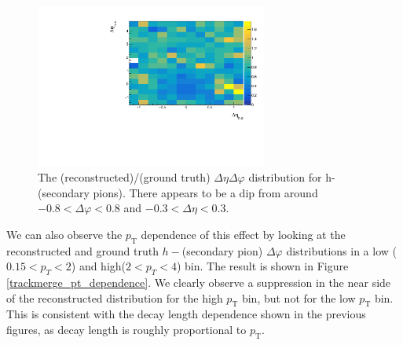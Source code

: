 \documentclass[ALICE,manyauthors]{ALICE_analysis_notes}
\begin{document}
\begin{figure}[ht]
\centering
\includegraphics[width=3in]{figures/h_secondary_pi_mc_ratio.pdf}
\caption{The  (reconstructed)/(ground truth)  $\Delta\eta\Delta\varphi$  distribution for h-(secondary pions). There appears to be a dip from around $-0.8 < \Delta\varphi < 0.8$ and $-0.3 < \Delta\eta < 0.3$.}
\label{h_secondary_pi_mc_ratio}
\end{figure}

We can also observe the $p_\text{T}$ dependence of this effect by looking at the reconstructed and ground truth $h-$(secondary pion) $\Delta\varphi$ distributions in a low ($0.15 < p_{T} < 2$) and high($2 < p_{T} < 4$) bin. The result is shown in Figure \ref{trackmerge_pt_dependence}. We clearly observe a suppression in the near side of the reconstructed distribution for the high $p_\text{T}$ bin, but not for the low $p_\text{T}$ bin.  This is consistent with the decay length dependence shown in the previous figures, as decay length is roughly proportional to $p_\text{T}$.
\end{document}
